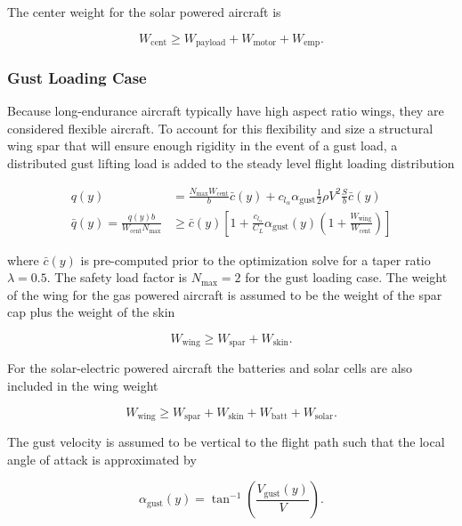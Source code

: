 The center weight for the solar powered aircraft is

\begin{equation}
    W_{\text{cent}} \geq W_{\text{payload}} + W_{\text{motor}} + W_{\text{emp}}.
\end{equation}


\subsubsection{Gust Loading Case}

Because long-endurance aircraft typically have high aspect ratio wings, they are considered flexible aircraft. 
To account for this flexibility and size a structural wing spar that will ensure enough rigidity in the event of a gust load, a distributed gust lifting load is added to the steady level flight loading distribution 

\begin{align}
    q(y) &= \frac{N_{\text{max}}W_{\text{cent}}}{b}\bar{c}(y) + c_{l_{\alpha}} \alpha_{\text{gust}} \frac{1}{2} \rho V^2 \frac{S}{b}\bar{c}(y) \\
    \bar{q}(y) = \frac{q(y)b}{W_{\text{cent}}N_{\text{max}}} &\geq \bar{c}(y) \left[1 + \frac{c_{l_{\alpha}}}{C_L} \alpha_{\text{gust}} (y) \left(1 + \frac{W_{\text{wing}}}{W_{\text{cent}}} \right) \right]
\end{align}

where $\bar{c}(y)$ is pre-computed prior to the optimization solve for a taper ratio $\lambda = 0.5$. The safety load factor is $N_{\text{max}}=2$ for the gust loading case. The weight of the wing for the gas powered aircraft is assumed to be the weight of the spar cap plus the weight of the skin 

\begin{equation}
    W_{\text{wing}} \geq W_{\text{spar}} + W_{\text{skin}}.
\end{equation}

For the solar-electric powered aircraft the batteries and solar cells are also included in the wing weight

\begin{equation}
    W_{\text{wing}} \geq W_{\text{spar}} + W_{\text{skin}} + W_{\text{batt}} + W_{\text{solar}}.
\end{equation}

The gust velocity is assumed to be vertical to the flight path such that the local angle of attack is approximated by 

\begin{equation}
    \label{e:gustalpha}
    \alpha_{\text{gust}}(y)  = \tan^{-1}\left(\frac{V_{\text{gust}}(y)}{V} \right).
\end{equation}

